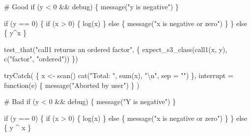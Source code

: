 \documentclass[twoside, pagesize, fontsize=11pt, dvipsnames]{scrreport} %
\newenvironment{Shaded}{\begin{snugshade}}{\end{snugshade}}
\newcommand{\AttributeTok}[1]{\textcolor[rgb]{0.40,0.45,0.13}{#1}}
\newcommand{\CommentTok}[1]{\textcolor[rgb]{0.37,0.37,0.37}{#1}}
\newcommand{\ControlFlowTok}[1]{\textcolor[rgb]{0.00,0.23,0.31}{#1}}
\newcommand{\DecValTok}[1]{\textcolor[rgb]{0.68,0.00,0.00}{#1}}
\newcommand{\FunctionTok}[1]{\textcolor[rgb]{0.28,0.35,0.67}{#1}}
\newcommand{\NormalTok}[1]{\textcolor[rgb]{0.00,0.23,0.31}{#1}}
\newcommand{\OtherTok}[1]{\textcolor[rgb]{0.00,0.23,0.31}{#1}}
\newcommand{\SpecialCharTok}[1]{\textcolor[rgb]{0.37,0.37,0.37}{#1}}
\newcommand{\StringTok}[1]{\textcolor[rgb]{0.13,0.47,0.30}{#1}}
\begin{document}
\begin{Shaded}
\begin{Highlighting}[]
\CommentTok{\# Good}
\ControlFlowTok{if}\NormalTok{ (y }\SpecialCharTok{\textless{}} \DecValTok{0} \SpecialCharTok{\&\&}\NormalTok{ debug) \{}
  \FunctionTok{message}\NormalTok{(}\StringTok{"y is negative"}\NormalTok{)}
\NormalTok{\}}

\ControlFlowTok{if}\NormalTok{ (y }\SpecialCharTok{==} \DecValTok{0}\NormalTok{) \{}
  \ControlFlowTok{if}\NormalTok{ (x }\SpecialCharTok{\textgreater{}} \DecValTok{0}\NormalTok{) \{}
    \FunctionTok{log}\NormalTok{(x)}
\NormalTok{  \} }\ControlFlowTok{else}\NormalTok{ \{}
    \FunctionTok{message}\NormalTok{(}\StringTok{"x is negative or zero"}\NormalTok{)}
\NormalTok{  \}}
\NormalTok{\} }\ControlFlowTok{else}\NormalTok{ \{}
\NormalTok{  y}\SpecialCharTok{\^{}}\NormalTok{x}
\NormalTok{\}}

\FunctionTok{test\_that}\NormalTok{(}\StringTok{"call1 returns an ordered factor"}\NormalTok{, \{}
  \FunctionTok{expect\_s3\_class}\NormalTok{(}\FunctionTok{call1}\NormalTok{(x, y), }\FunctionTok{c}\NormalTok{(}\StringTok{"factor"}\NormalTok{, }\StringTok{"ordered"}\NormalTok{))}
\NormalTok{\})}

\FunctionTok{tryCatch}\NormalTok{(}
\NormalTok{  \{}
\NormalTok{    x }\OtherTok{\textless{}{-}} \FunctionTok{scan}\NormalTok{()}
    \FunctionTok{cat}\NormalTok{(}\StringTok{"Total: "}\NormalTok{, }\FunctionTok{sum}\NormalTok{(x), }\StringTok{"}\SpecialCharTok{\textbackslash{}n}\StringTok{"}\NormalTok{, }\AttributeTok{sep =} \StringTok{""}\NormalTok{)}
\NormalTok{  \},}
  \AttributeTok{interrupt =} \ControlFlowTok{function}\NormalTok{(e) \{}
    \FunctionTok{message}\NormalTok{(}\StringTok{"Aborted by user"}\NormalTok{)}
\NormalTok{  \}}
\NormalTok{)}

\CommentTok{\# Bad}
\ControlFlowTok{if}\NormalTok{ (y }\SpecialCharTok{\textless{}} \DecValTok{0} \SpecialCharTok{\&\&}\NormalTok{ debug) \{}
\FunctionTok{message}\NormalTok{(}\StringTok{"Y is negative"}\NormalTok{)}
\NormalTok{\}}

\ControlFlowTok{if}\NormalTok{ (y }\SpecialCharTok{==} \DecValTok{0}\NormalTok{)}
\NormalTok{\{}
    \ControlFlowTok{if}\NormalTok{ (x }\SpecialCharTok{\textgreater{}} \DecValTok{0}\NormalTok{) \{}
      \FunctionTok{log}\NormalTok{(x)}
\NormalTok{    \} }\ControlFlowTok{else}\NormalTok{ \{}
  \FunctionTok{message}\NormalTok{(}\StringTok{"x is negative or zero"}\NormalTok{)}
\NormalTok{    \}}
\NormalTok{\} }\ControlFlowTok{else}\NormalTok{ \{ y }\SpecialCharTok{\^{}}\NormalTok{ x \}}
\end{Highlighting}
\end{Shaded}
\end{document}

